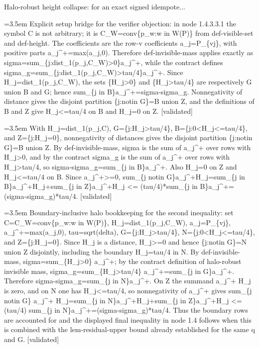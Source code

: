 \documentclass{article}
\newcommand{\step}[1]{\par\noindent\hangindent=3.5em\hangafter=1%
  \makebox[3.5em][l]{\textbf{#1.}}}
\newcommand{\steptag}[1]{\hfill{\small\textsf{[#1]}}}
\begin{document}
\begin{proofbox}{Halo-robust height collapse: for an exact signed idempote...}
\step{1.4.3.3.1.1} Explicit setup bridge for the verifier objection: in node 1.4.3.3.1 the symbol C is not arbitrary; it is C\_W=conv\{p\_w:w in W(P)\} from def-visible-set and def-height. The coefficients are the row-v coefficients a\_j=P\_\{vj\}, with positive parts a\_j\textasciicircum{}+=max(a\_j,0). Therefore def-invisible-mass applies exactly as sigma=sum\_\{j:dist\_1(p\_j,C\_W)>0\}a\_j\textasciicircum{}+, while the contract defines sigma\_g=sum\_\{j:dist\_1(p\_j,C\_W)>tau/4\}a\_j\textasciicircum{}+. Since H\_j=dist\_1(p\_j,C\_W), the sets \{H\_j>0\} and \{H\_j>tau/4\} are respectively G union B and G; hence sum\_\{j in B\}a\_j\textasciicircum{}+=sigma-sigma\_g. Nonnegativity of distance gives the disjoint partition \{j:notin G\}=B union Z, and the definitions of B and Z give H\_j<=tau/4 on B and H\_j=0 on Z. \steptag{validated} \\[4pt]
\step{1.4.3.3.2} With H\_j=dist\_1(p\_j,C), G=\{j:H\_j>tau/4\}, B=\{j:0<H\_j<=tau/4\}, and Z=\{j:H\_j=0\}, nonnegativity of distances gives the disjoint partition \{j:notin G\}=B union Z. By def-invisible-mass, sigma is the sum of a\_j\textasciicircum{}+ over rows with H\_j>0, and by the contract sigma\_g is the sum of a\_j\textasciicircum{}+ over rows with H\_j>tau/4, so sigma-sigma\_g=sum\_\{j in B\}a\_j\textasciicircum{}+. Also H\_j=0 on Z and H\_j<=tau/4 on B. Since a\_j\textasciicircum{}+>=0, sum\_\{j notin G\}a\_j\textasciicircum{}+H\_j=sum\_\{j in B\}a\_j\textasciicircum{}+H\_j+sum\_\{j in Z\}a\_j\textasciicircum{}+H\_j <= (tau/4)*sum\_\{j in B\}a\_j\textasciicircum{}+=(sigma-sigma\_g)*tau/4. \steptag{validated} \\[4pt]
\step{1.4.4} Boundary-inclusive halo bookkeeping for the second inequality: set C=C\_W=conv\{p\_w:w in W(P)\}, H\_j=dist\_1(p\_j,C\_W), a\_j=P\_\{vj\}, a\_j\textasciicircum{}+=max(a\_j,0), tau=sqrt(delta), G=\{j:H\_j>tau/4\}, N=\{j:0<H\_j<=tau/4\}, and Z=\{j:H\_j=0\}. Since H\_j is a distance, H\_j>=0 and hence \{j:notin G\}=N union Z disjointly, including the boundary H\_j=tau/4 in N. By def-invisible-mass, sigma=sum\_\{H\_j>0\} a\_j\textasciicircum{}+; by the contract definition of halo-robust invisible mass, sigma\_g=sum\_\{H\_j>tau/4\} a\_j\textasciicircum{}+=sum\_\{j in G\}a\_j\textasciicircum{}+. Therefore sigma-sigma\_g=sum\_\{j in N\}a\_j\textasciicircum{}+. On Z the summand a\_j\textasciicircum{}+ H\_j is zero, and on N one has H\_j<=tau/4, so nonnegativity of a\_j\textasciicircum{}+ gives sum\_\{j notin G\} a\_j\textasciicircum{}+ H\_j=sum\_\{j in N\}a\_j\textasciicircum{}+H\_j+sum\_\{j in Z\}a\_j\textasciicircum{}+H\_j <= (tau/4) sum\_\{j in N\}a\_j\textasciicircum{}+=(sigma-sigma\_g)*tau/4. Thus the boundary rows are accounted for and the displayed final inequality in node 1.4 follows when this is combined with the lem-residual-upper bound already established for the same q and G. \steptag{validated} \\[4pt]

\end{proofbox}
\end{document}
